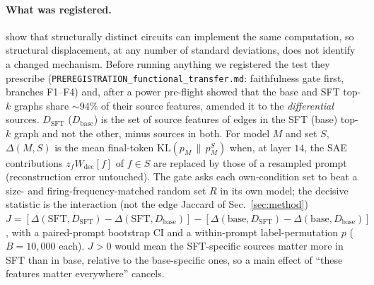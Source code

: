 \documentclass{article}
\begin{document}
\paragraph{What was registered.} \citet{bayatmakou2026manycircuits} show that structurally distinct circuits can implement the same computation, so structural displacement, at any number of standard deviations, does not identify a changed mechanism. Before running anything we registered the test they prescribe (\texttt{PREREGISTRATION\_functional\_transfer.md}: faithfulness gate first, branches F1--F4) and, after a power pre-flight showed that the base and SFT top-$k$ graphs share ${\sim}94\%$ of their source features, amended it to the \emph{differential} sources. $D_{\mathrm{SFT}}$ ($D_{\mathrm{base}}$) is the set of source features of edges in the SFT (base) top-$k$ graph and not the other, minus sources in both. For model $M$ and set $S$, $\Delta(M,S)$ is the mean final-token $\mathrm{KL}(p_M\,\|\,p_M^{S})$ when, at layer $14$, the SAE contributions $z_f W_{\mathrm{dec}}[f]$ of $f\in S$ are replaced by those of a resampled prompt (reconstruction error untouched). The gate asks each own-condition set to beat a size- and firing-frequency-matched random set $R$ in its own model; the decisive statistic is the interaction (not the edge Jaccard of Sec.~\ref{sec:method})
$J=[\Delta(\mathrm{SFT},D_{\mathrm{SFT}})-\Delta(\mathrm{SFT},D_{\mathrm{base}})]-[\Delta(\mathrm{base},D_{\mathrm{SFT}})-\Delta(\mathrm{base},D_{\mathrm{base}})]$, with a paired-prompt bootstrap CI and a within-prompt label-permutation $p$ ($B=10{,}000$ each). $J>0$ would mean the SFT-specific sources matter more in SFT than in base, relative to the base-specific ones, so a main effect of ``these features matter everywhere'' cancels.
\end{document}

